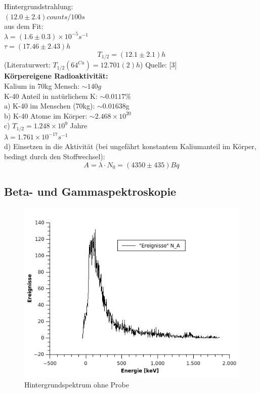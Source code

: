 \documentclass[12pt,a4paper]{article}
\begin{document}
\begin{multicols}{2}
\noindent Hintergrundstrahlung:\\
$(12.0 \pm 2.4) counts/ 100s$\\

 \noindent aus dem Fit:\\
$\lambda = (1.6 \pm 0.3)\times10^{-5}s^{-1}$\\
 $\tau = (17.46 \pm 2.43)h$\\
 $$T_{1/2} = (12.1 \pm 2.1)h$$
(Literaturwert: $T_{1/2} ({64}^{Cu}) = 12.701(2) h$)
 Quelle: [3]\\

\noindent \textbf{Körpereigene Radioaktivität:}\\
Kalium in 70kg Mensch: $\sim 140g$\\
K-40 Anteil in natürlichem K: $\sim 0.0117\%$\\
a) K-40 im Menschen (70kg): $\sim 0.01638$g\\
b) K-40 Atome im Körper: $\sim 2.468 \times 10^{20}$\\
c) $T_{1/2} = 1.248 \times 10^9$ Jahre\\
$\lambda = 1.761 \times 10^{-17}s^{-1}$\\

\noindent d) Einsetzen in die Aktivität (bei ungefährt konstantem Kaliumanteil im Körper, bedingt durch den Stoffwechsel):\\
$$A = \lambda \cdot N_0 = (4350 \pm 435) Bq$$



\subsection{Beta- und Gammaspektroskopie}
\begin{figure}[H]
	\centering
	\includegraphics[scale=1.2]{./figures/GammaBettaHintergrundStrahlung.png}
	\caption{Hintergrundspektrum ohne Probe}
	\label{fig:ausw_gammabetta_hintergrund}
\end{figure}


\end{multicols}
\end{document}
